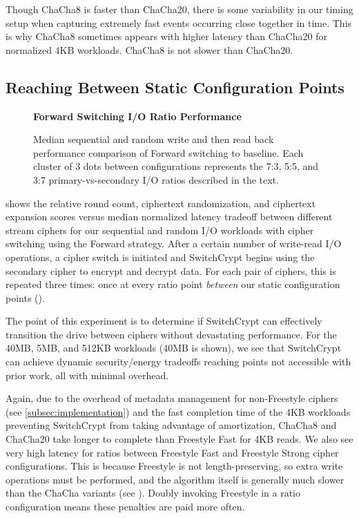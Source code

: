Though ChaCha8 is faster than ChaCha20, there is some variability in
our timing setup when capturing extremely fast events occurring close together
in time. This is why ChaCha8 sometimes appears with higher latency than ChaCha20
for normalized 4KB workloads. ChaCha8 is not slower than ChaCha20.

\subsection{Reaching Between Static Configuration Points} \label{subsec:2}

\begin{figure}[ht]
  \textbf{Forward Switching I/O Ratio Performance}\par\medskip
  {} \caption{Median sequential and random
  write and then read back performance comparison of Forward switching to
  baseline. Each cluster of 3 dots between configurations represents the 7:3,
  5:5, and 3:7 primary-vs-secondary I/O ratios described in the text.}
 \label{fig:tradeoff-with-ratios}
\end{figure}

 shows the relative round count, ciphertext
randomization, and ciphertext expansion scores versus median normalized latency
tradeoff between different stream ciphers for our sequential and random I/O
workloads with cipher switching using the Forward strategy. After a certain
number of write-read I/O operations, a cipher switch is initiated and
SwitchCrypt begins using the secondary cipher to encrypt and decrypt data. For
each pair of ciphers, this is repeated three times: once at every ratio point
\emph{between} our static configuration points ().

The point of this experiment is to determine if SwitchCrypt can effectively
transition the drive between ciphers without devastating performance. For the
40MB, 5MB, and 512KB workloads (40MB is shown), we see that SwitchCrypt can
achieve dynamic security/energy tradeoffs reaching points not accessible with
prior work, all with minimal overhead.

Again, due to the overhead of metadata management for non-Freestyle ciphers (see
\cref{subsec:implementation}) and the fast completion time of the 4KB workloads
preventing SwitchCrypt from taking advantage of amortization, ChaCha8 and
ChaCha20 take longer to complete than Freestyle Fast for 4KB reads. We also see
very high latency for ratios between Freestyle Fast and Freestyle Strong cipher
configurations. This is because Freestyle is not length-preserving, so extra
write operations must be performed, and the algorithm itself is generally much
slower than the ChaCha variants (see ). Doubly
invoking Freestyle in a ratio configuration means these penalties are paid more
often.

